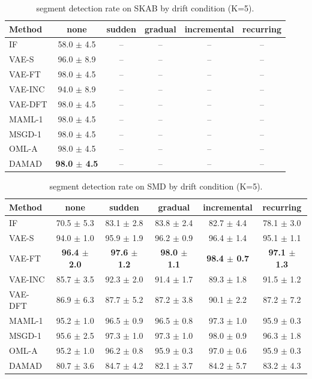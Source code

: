 \begin{table}[t]
\centering
\small
\caption{segment detection rate on SKAB by drift condition (K=5).}
\label{tab:drift_segment_detection_rate_skab}
\begin{tabular}{lccccc}
\toprule
Method & none & sudden & gradual & incremental & recurring \\
\midrule
IF & 58.0 $\pm$ 4.5 & – & – & – & – \\
VAE-S & 96.0 $\pm$ 8.9 & – & – & – & – \\
VAE-FT & 98.0 $\pm$ 4.5 & – & – & – & – \\
VAE-INC & 94.0 $\pm$ 8.9 & – & – & – & – \\
VAE-DFT & 98.0 $\pm$ 4.5 & – & – & – & – \\
MAML-1 & 98.0 $\pm$ 4.5 & – & – & – & – \\
MSGD-1 & 98.0 $\pm$ 4.5 & – & – & – & – \\
OML-A & 98.0 $\pm$ 4.5 & – & – & – & – \\
DAMAD & \textbf{98.0 $\pm$ 4.5} & – & – & – & – \\
\bottomrule
\end{tabular}
\end{table}

\begin{table}[t]
\centering
\small
\caption{segment detection rate on SMD by drift condition (K=5).}
\label{tab:drift_segment_detection_rate_smd}
\begin{tabular}{lccccc}
\toprule
Method & none & sudden & gradual & incremental & recurring \\
\midrule
IF & 70.5 $\pm$ 5.3 & 83.1 $\pm$ 2.8 & 83.8 $\pm$ 2.4 & 82.7 $\pm$ 4.4 & 78.1 $\pm$ 3.0 \\
VAE-S & 94.0 $\pm$ 1.0 & 95.9 $\pm$ 1.9 & 96.2 $\pm$ 0.9 & 96.4 $\pm$ 1.4 & 95.1 $\pm$ 1.1 \\
VAE-FT & \textbf{96.4 $\pm$ 2.0} & \textbf{97.6 $\pm$ 1.2} & \textbf{98.0 $\pm$ 1.1} & \textbf{98.4 $\pm$ 0.7} & \textbf{97.1 $\pm$ 1.3} \\
VAE-INC & 85.7 $\pm$ 3.5 & 92.3 $\pm$ 2.0 & 91.4 $\pm$ 1.7 & 89.3 $\pm$ 1.8 & 91.5 $\pm$ 1.2 \\
VAE-DFT & 86.9 $\pm$ 6.3 & 87.7 $\pm$ 5.2 & 87.2 $\pm$ 3.8 & 90.1 $\pm$ 2.2 & 87.2 $\pm$ 7.2 \\
MAML-1 & 95.2 $\pm$ 1.0 & 96.5 $\pm$ 0.9 & 96.5 $\pm$ 0.8 & 97.3 $\pm$ 1.0 & 95.9 $\pm$ 0.3 \\
MSGD-1 & 95.6 $\pm$ 2.5 & 97.3 $\pm$ 1.0 & 97.3 $\pm$ 1.0 & 98.0 $\pm$ 0.9 & 96.3 $\pm$ 1.8 \\
OML-A & 95.2 $\pm$ 1.0 & 96.2 $\pm$ 0.8 & 95.9 $\pm$ 0.3 & 97.0 $\pm$ 0.6 & 95.9 $\pm$ 0.3 \\
DAMAD & 80.7 $\pm$ 3.6 & 84.7 $\pm$ 4.2 & 82.1 $\pm$ 3.7 & 84.2 $\pm$ 5.7 & 83.2 $\pm$ 4.3 \\
\bottomrule
\end{tabular}
\end{table}

